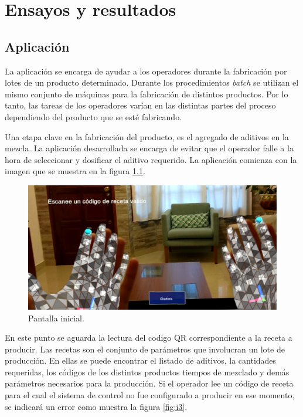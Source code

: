 
\chapter{Ensayos y resultados} %

\label{Chapter4} %

\section{Aplicación}

La aplicación se encarga de ayudar a los operadores durante la fabricación por lotes de un producto determinado. Durante los procedimientos \textit{batch} se utilizan el mismo conjunto de máquinas para la fabricación de distintos productos. Por lo tanto, las tareas de los operadores varían en las distintas partes del proceso dependiendo del producto que se esté fabricando. 

Una etapa clave en la fabricación del producto, es el agregado de aditivos en la mezcla. La aplicación desarrollada se encarga de evitar que el operador falle a la hora de seleccionar y dosificar el aditivo requerido. La aplicación comienza con la imagen que se muestra en la figura \ref{fig:i2}.

\begin{figure}[htpb]
	\centering
	\includegraphics[scale=.5]{./Figures/i2.PNG}
	\caption{Pantalla inicial\protect\footnotemark.}
	\label{fig:i2}
\end{figure}

En este punto se aguarda la lectura del codigo QR correspondiente a la receta a producir. Las recetas son el conjunto de parámetros que involucran un lote de producción. En ellas se puede encontrar el listado de aditivos, la cantidades requeridas, los códigos de los distintos productos tiempos de mezclado y demás parámetros necesarios para la producción. Si el operador lee un código de receta para el cual el sistema de control no fue configurado a producir en ese momento, se indicará un error como muestra la figura \ref{fig:i3}.

